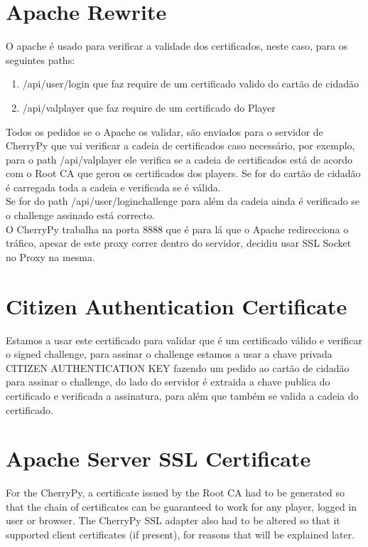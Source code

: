\documentclass[11pt,a4paper]{report}
\begin{document}
\section{Apache Rewrite}

O apache é usado para verificar a validade dos certificados, neste caso, para os seguintes paths:
\begin{enumerate}
\item /api/user/login que faz require de um certificado valido do cartão de cidadão
\item /api/valplayer que faz require de um certificado do Player
\end{enumerate}

Todos os pedidos se o Apache os validar, são enviados para o servidor de CherryPy que vai verificar a cadeia de certificados caso necessário, por exemplo, para o path /api/valplayer ele verifica se a cadeia de certificados está de acordo com o Root CA que gerou os certificados dos players. Se for do cartão de cidadão é carregada toda a cadeia e verificada se é válida.\\
Se for do path /api/user/loginchallenge para além da cadeia ainda é verificado se o challenge assinado está correcto.\\

O CherryPy trabalha na porta 8888 que é para lá que o Apache redirecciona o tráfico, apesar de este proxy correr dentro do servidor, decidiu usar SSL Socket no Proxy na mesma.

\section{Citizen Authentication Certificate}

Estamos a usar este certificado para validar que é um certificado válido e verificar o signed challenge, para assinar o challenge estamos a usar a chave privada CITIZEN AUTHENTICATION KEY fazendo um pedido ao cartão de cidadão para assinar o challenge, do lado do servidor é extraida a chave publica do certificado e verificada a assinatura, para além que também se valida a cadeia do certificado.

\section{Apache Server SSL Certificate}

For the CherryPy, a certificate issued by the Root CA had to be generated so that the chain of certificates can be guaranteed to work for any player, logged in user or browser. The CherryPy SSL adapter also had to be altered so that it supported client certificates (if present), for reasons that will be explained later.
\end{document}

